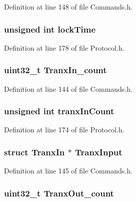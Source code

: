Definition at line 148 of file Commands.h.

\hypertarget{struct_cmd_tranx_ace6436ac55ff63b037da554bf1ddfc32}{
\subsubsection[{lockTime}]{\setlength{\rightskip}{0pt plus 5cm}unsigned int {\bf lockTime}}}
\label{struct_cmd_tranx_ace6436ac55ff63b037da554bf1ddfc32}


Definition at line 178 of file Protocol.h.

\hypertarget{struct_cmd_tranx_a29cd42e9db0010d7b5bb283bf2604765}{
\subsubsection[{TranxIn\_\-count}]{\setlength{\rightskip}{0pt plus 5cm}uint32\_\-t {\bf TranxIn\_\-count}}}
\label{struct_cmd_tranx_a29cd42e9db0010d7b5bb283bf2604765}


Definition at line 144 of file Commands.h.

\hypertarget{struct_cmd_tranx_aee4a92ad1604309b8526009831b57c58}{
\subsubsection[{tranxInCount}]{\setlength{\rightskip}{0pt plus 5cm}unsigned int {\bf tranxInCount}}}
\label{struct_cmd_tranx_aee4a92ad1604309b8526009831b57c58}


Definition at line 174 of file Protocol.h.

\hypertarget{struct_cmd_tranx_a5b66f083197ffa9abe32484db40fcd39}{
\subsubsection[{TranxInput}]{\setlength{\rightskip}{0pt plus 5cm}struct {\bf TranxIn} $\ast$ {\bf TranxInput}}}
\label{struct_cmd_tranx_a5b66f083197ffa9abe32484db40fcd39}


Definition at line 145 of file Commands.h.

\hypertarget{struct_cmd_tranx_a64038348b38f758be9417994e2f823a3}{
\subsubsection[{TranxOut\_\-count}]{\setlength{\rightskip}{0pt plus 5cm}uint32\_\-t {\bf TranxOut\_\-count}}}
\label{struct_cmd_tranx_a64038348b38f758be9417994e2f823a3}


